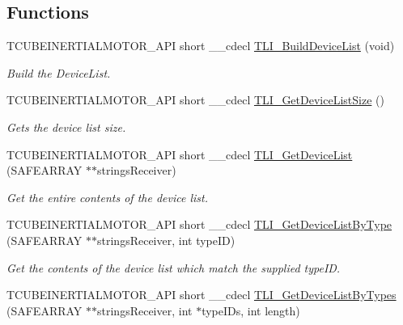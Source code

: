\subsection*{Functions}
\begin{DoxyCompactItemize}
\item 
T\+C\+U\+B\+E\+I\+N\+E\+R\+T\+I\+A\+L\+M\+O\+T\+O\+R\+\_\+\+A\+PI short \+\_\+\+\_\+cdecl \hyperlink{group___t_cube_inertial_motor_gacd7ce4d7bfe082e38c82865e6b382056}{T\+L\+I\+\_\+\+Build\+Device\+List} (void)
\begin{DoxyCompactList}\small\item\em Build the Device\+List. \end{DoxyCompactList}\item 
T\+C\+U\+B\+E\+I\+N\+E\+R\+T\+I\+A\+L\+M\+O\+T\+O\+R\+\_\+\+A\+PI short \+\_\+\+\_\+cdecl \hyperlink{group___t_cube_inertial_motor_gad736f9571e140ed6121ef7c062b08139}{T\+L\+I\+\_\+\+Get\+Device\+List\+Size} ()
\begin{DoxyCompactList}\small\item\em Gets the device list size. \end{DoxyCompactList}\item 
T\+C\+U\+B\+E\+I\+N\+E\+R\+T\+I\+A\+L\+M\+O\+T\+O\+R\+\_\+\+A\+PI short \+\_\+\+\_\+cdecl \hyperlink{group___t_cube_inertial_motor_gaee51649989ffd45b3aad1d27253c1eec}{T\+L\+I\+\_\+\+Get\+Device\+List} (S\+A\+F\+E\+A\+R\+R\+AY $\ast$$\ast$strings\+Receiver)
\begin{DoxyCompactList}\small\item\em Get the entire contents of the device list. \end{DoxyCompactList}\item 
T\+C\+U\+B\+E\+I\+N\+E\+R\+T\+I\+A\+L\+M\+O\+T\+O\+R\+\_\+\+A\+PI short \+\_\+\+\_\+cdecl \hyperlink{group___t_cube_inertial_motor_gaab72bf6cfc5839321353f4388cea1fef}{T\+L\+I\+\_\+\+Get\+Device\+List\+By\+Type} (S\+A\+F\+E\+A\+R\+R\+AY $\ast$$\ast$strings\+Receiver, int type\+ID)
\begin{DoxyCompactList}\small\item\em Get the contents of the device list which match the supplied type\+ID. \end{DoxyCompactList}\item 
T\+C\+U\+B\+E\+I\+N\+E\+R\+T\+I\+A\+L\+M\+O\+T\+O\+R\+\_\+\+A\+PI short \+\_\+\+\_\+cdecl \hyperlink{group___t_cube_inertial_motor_gafee155b1714e32523ed9024301926e7e}{T\+L\+I\+\_\+\+Get\+Device\+List\+By\+Types} (S\+A\+F\+E\+A\+R\+R\+AY $\ast$$\ast$strings\+Receiver, int $\ast$type\+I\+Ds, int length)
$$
\end{DoxyCompactItemize}
